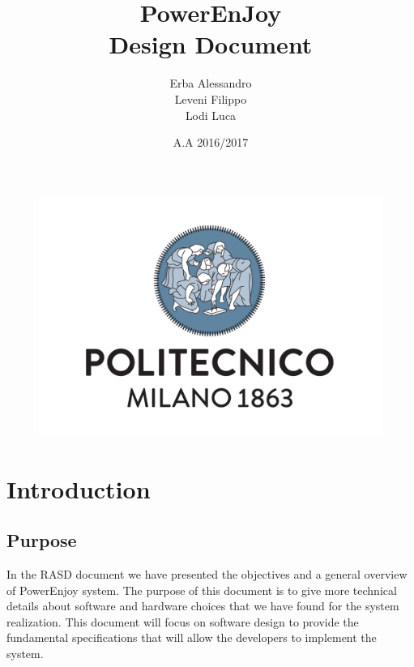 \documentclass[english]{article}
\begin{document}
	\begin{figure}
		\centering
		\includegraphics[scale=0.5]{logo.pdf} 
	\end{figure}


	\title{PowerEnJoy\\
	Design Document\\
	}

	\date{A.A 2016/2017}
	
	\author{Erba Alessandro\\
	 Leveni Filippo\\
	 Lodi Luca}
	
	\maketitle
	\pagebreak{}

\tableofcontents{} \pagebreak{}
\section{Introduction}
	\subsection{Purpose}
		In the RASD document we have presented the objectives and a general overview of PowerEnjoy system.
		The purpose of this document is to give more technical details about software and hardware choices that we have found for the system realization.
		This document will focus on software design to provide the fundamental specifications that will allow the developers to implement the system.
\end{document}
